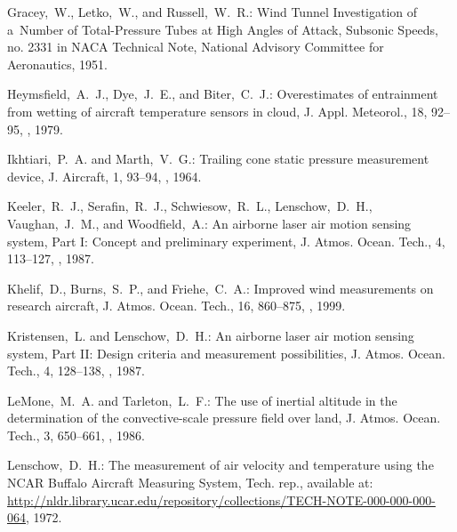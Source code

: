 \documentclass[amtd, online, hvmath]{copernicus}
\begin{document}
\begin{thebibliography}{30}
Gracey,~W., Letko,~W., and Russell,~W.~R.: {Wind Tunnel Investigation of a~Number
 of Total-Pressure Tubes at High Angles of Attack, Subsonic Speeds}, no. 2331
 in {NACA Technical Note}, National Advisory Committee for Aeronautics, 1951.


Heymsfield,~A.~J., Dye,~J.~E., and Biter,~C.~J.: {Overestimates of entrainment
from wetting of aircraft temperature sensors in cloud}, J. Appl. Meteorol., 18,
92--95, , 1979.


Ikhtiari,~P.~A. and Marth,~V.~G.: {Trailing cone static pressure measurement device}, {J. Aircraft}, 1, 93--94, , 1964.


Keeler,~R.~J., Serafin,~R.~J., Schwiesow,~R.~L., Lenschow,~D.~H., Vaughan,~J.~M.,
and Woodfield,~A.: {An airborne laser air motion sensing system, Part I: Concept
and preliminary experiment}, {J. Atmos. Ocean. Tech.}, 4, 113--127, , 1987.


Khelif,~D., Burns,~S.~P., and Friehe,~C.~A.: {Improved wind measurements on
research aircraft}, {J. Atmos. Ocean. Tech.}, {16}, {860--875}, , {1999}.


Kristensen,~L. and Lenschow,~D.~H.: {An airborne laser air motion sensing system,
Part II: Design criteria and measurement possibilities}, {J. Atmos. Ocean. Tech.}, 4, 128--138, , 1987.


LeMone,~M.~A. and Tarleton,~L.~F.: {The use of inertial altitude in the determination
of the convective-scale pressure field over land}, {J. Atmos. Ocean. Tech.}, {3}, {650--661}, , {1986}.


Lenschow,~D.~H.: {The measurement of air velocity and temperature
  using the NCAR Buffalo Aircraft Measuring System}, Tech. rep.,
available at: \url{http://nldr.library.ucar.edu/repository/collections/TECH-NOTE-000-000-000-064},
1972.



\end{thebibliography}
\end{document}
